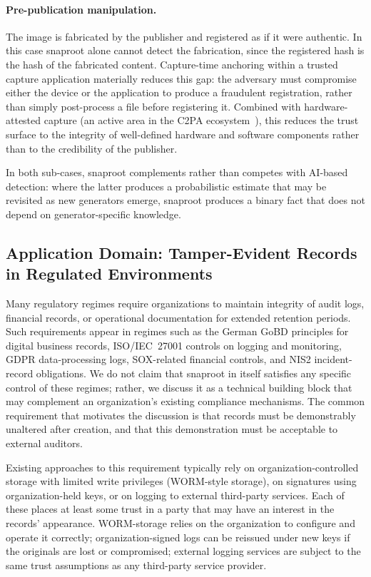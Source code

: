 \documentclass[11pt,a4paper]{article}
\begin{document}
\paragraph{Pre-publication manipulation.} The image is fabricated by
the publisher and registered as if it were authentic. In this case
snaproot alone cannot detect the fabrication, since the registered
hash is the hash of the fabricated content. Capture-time anchoring
within a trusted capture application materially reduces this gap: the
adversary must compromise either the device or the application to
produce a fraudulent registration, rather than simply post-process a
file before registering it. Combined with hardware-attested capture
(an active area in the C2PA ecosystem~\cite{c2pa2023spec}), this
reduces the trust surface to the integrity of well-defined hardware
and software components rather than to the credibility of the
publisher.

In both sub-cases, snaproot complements rather than competes with
AI-based detection: where the latter produces a probabilistic estimate
that may be revisited as new generators emerge, snaproot produces a
binary fact that does not depend on generator-specific knowledge.

\subsection{Application Domain: Tamper-Evident Records in Regulated Environments}
\label{sec:discussion:compliance}

Many regulatory regimes require organizations to maintain integrity
of audit logs, financial records, or operational documentation for
extended retention periods. Such requirements appear in regimes such
as the German GoBD principles for digital business records,
ISO/IEC~27001 controls on logging and monitoring, GDPR data-processing
logs, SOX-related financial controls, and NIS2 incident-record
obligations. We do not claim that snaproot in itself satisfies any
specific control of these regimes; rather, we discuss it as a
technical building block that may complement an organization's
existing compliance mechanisms. The common requirement that motivates
the discussion is that records must be demonstrably unaltered after
creation, and that this demonstration must be acceptable to external
auditors.

Existing approaches to this requirement typically rely on
organization-controlled storage with limited write privileges
(WORM-style storage), on signatures using organization-held keys, or
on logging to external third-party services. Each of these places at
least some trust in a party that may have an interest in the records'
appearance. WORM-storage relies on the organization to configure and
operate it correctly; organization-signed logs can be reissued under
new keys if the originals are lost or compromised; external logging
services are subject to the same trust assumptions as any third-party
service provider.
\end{document}
